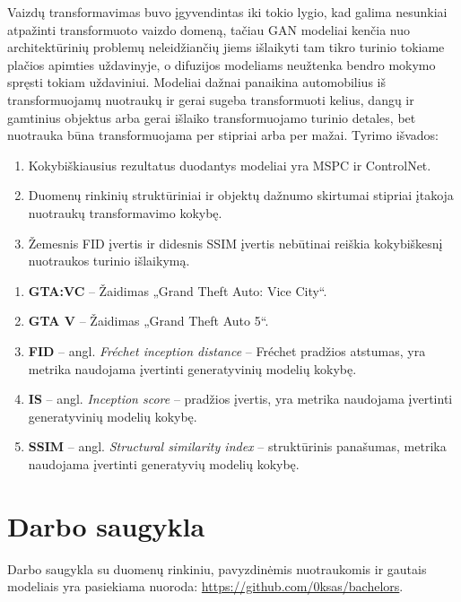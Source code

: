 \documentclass{VUMIFPSbakalaurinis}
\begin{document}
    Vaizdų transformavimas buvo įgyvendintas iki tokio lygio, kad galima nesunkiai atpažinti transformuoto vaizdo domeną, tačiau GAN modeliai kenčia nuo architektūrinių problemų neleidžiančių jiems išlaikyti tam tikro turinio tokiame plačios apimties uždavinyje, o difuzijos modeliams neužtenka bendro mokymo spręsti tokiam uždaviniui. Modeliai dažnai panaikina automobilius iš transformuojamų nuotraukų ir gerai sugeba transformuoti kelius, dangų ir gamtinius objektus arba gerai išlaiko transformuojamo turinio detales, bet nuotrauka būna transformuojama per stipriai arba per mažai.
    Tyrimo išvados:
    \begin{enumerate}
        \item Kokybiškiausius rezultatus duodantys modeliai yra MSPC ir ControlNet.
        \item Duomenų rinkinių struktūriniai ir objektų dažnumo skirtumai stipriai įtakoja nuotraukų transformavimo kokybę.
        \item Žemesnis FID įvertis ir didesnis SSIM įvertis nebūtinai reiškia kokybiškesnį nuotraukos turinio išlaikymą.
    \end{enumerate}

\begin{enumerate}
    \item \textbf{GTA:VC} – Žaidimas „Grand Theft Auto: Vice City“.
    \item \textbf{GTA V} – Žaidimas „Grand Theft Auto 5“.
    \item \textbf{FID} – angl. \emph{Fréchet inception distance} – Fréchet pradžios atstumas, yra metrika naudojama įvertinti generatyvinių modelių kokybę.
    \item \textbf{IS} – angl. \emph{Inception score} – pradžios įvertis, yra metrika naudojama įvertinti generatyvinių modelių kokybę.
    \item \textbf{SSIM} – angl. \emph{Structural similarity index} – struktūrinis panašumas, metrika naudojama įvertinti generatyvių modelių kokybę.
\end{enumerate}

\printbibliography[heading=bibintoc]

\appendix

\section{Darbo saugykla}
    Darbo saugykla su duomenų rinkiniu, pavyzdinėmis nuotraukomis ir gautais modeliais yra pasiekiama nuoroda: \href{https://github.com/0ksas/bachelors}{https://github.com/0ksas/bachelors}.
\end{document}
